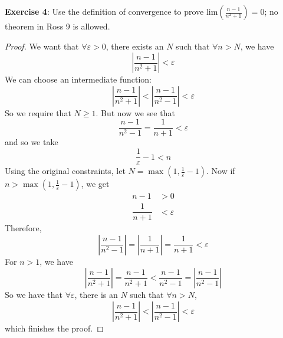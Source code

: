 \documentclass{article}
\begin{document}
\textbf{Exercise 4}: Use the definition of convergence to prove $\text{lim}(\frac{n - 1}{n^{2} + 1}) = 0$; no theorem in Ross 9 is allowed.
    \begin{proof}
        We want that $\forall \varepsilon > 0$, there exists an $N$ such that $\forall n > N$, we have
            \begin{equation*}
                \left\lvert \dfrac{n - 1}{n^{2} + 1} \right\rvert < \varepsilon
            \end{equation*}
        We can choose an intermediate function:
            \begin{equation*}
                \left\lvert \dfrac{n - 1}{n^{2} + 1} \right\rvert < \left\lvert \dfrac{n - 1}{n^{2} - 1} \right\rvert < \varepsilon
            \end{equation*}
        So we require that $N \geq 1$. But now we see that 
            \begin{equation*}
                \dfrac{n - 1}{n^{2} - 1} = \dfrac{1}{n + 1} < \varepsilon
            \end{equation*}
        and so we take
            \begin{equation*}
                \dfrac{1}{\varepsilon} - 1 < n
            \end{equation*}
        Using the original constraints, let $N = \max(1, \frac{1}{\varepsilon} - 1)$. Now if $n > \max(1, \frac{1}{\varepsilon} - 1)$, we get
            \begin{align*}
                n - 1     &>  0                                                       \\
                \dfrac{1}{n + 1} &< \varepsilon
            \end{align*}
        Therefore,
            \begin{equation*}
                \left\lvert \dfrac{n - 1}{n^{2} - 1} \right\rvert = \left\lvert \dfrac{1}{n + 1} \right\rvert = \dfrac{1}{n + 1} < \varepsilon
            \end{equation*}
        For $n > 1$, we have 
            \begin{equation*}
                \left\lvert \dfrac{n - 1}{n^{2} + 1} \right\rvert =  \dfrac{n - 1}{n^{2} + 1} < \dfrac{n - 1}{n^{2} - 1} = \left\lvert \dfrac{n - 1}{n^{2} - 1} \right\rvert
            \end{equation*}
        So we have that $\forall \varepsilon$, there is an $N$ such that $\forall n > N$,
            \begin{equation*}
                \left\lvert \dfrac{n - 1}{n^{2} + 1} \right\rvert < \left\lvert \dfrac{n - 1}{n^{2} - 1} \right\rvert < \varepsilon
            \end{equation*}
        which finishes the proof.
    \end{proof}
\end{document}
